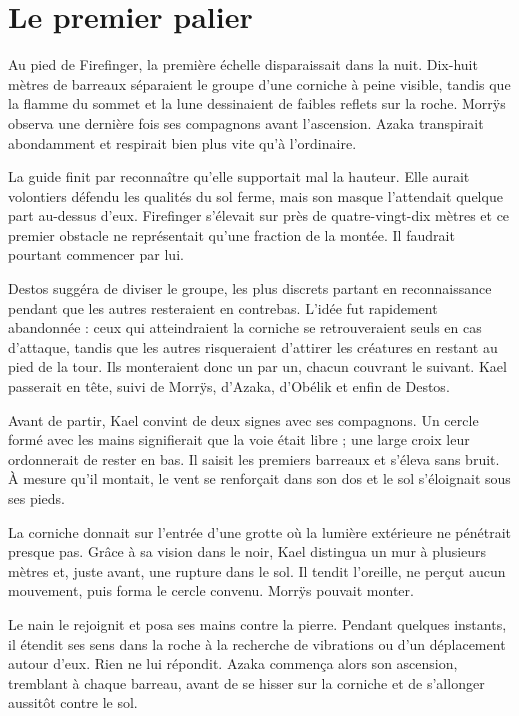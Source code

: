 \chapter{Le premier palier}

Au pied de Firefinger, la première échelle disparaissait dans la nuit. Dix-huit mètres de barreaux séparaient le groupe d'une corniche à peine visible, tandis que la flamme du sommet et la lune dessinaient de faibles reflets sur la roche. Morrÿs observa une dernière fois ses compagnons avant l'ascension. Azaka transpirait abondamment et respirait bien plus vite qu'à l'ordinaire.

La guide finit par reconnaître qu'elle supportait mal la hauteur. Elle aurait volontiers défendu les qualités du sol ferme, mais son masque l'attendait quelque part au-dessus d'eux. Firefinger s'élevait sur près de quatre-vingt-dix mètres et ce premier obstacle ne représentait qu'une fraction de la montée. Il faudrait pourtant commencer par lui.

Destos suggéra de diviser le groupe, les plus discrets partant en reconnaissance pendant que les autres resteraient en contrebas. L'idée fut rapidement abandonnée : ceux qui atteindraient la corniche se retrouveraient seuls en cas d'attaque, tandis que les autres risqueraient d'attirer les créatures en restant au pied de la tour. Ils monteraient donc un par un, chacun couvrant le suivant. Kael passerait en tête, suivi de Morrÿs, d'Azaka, d'Obélik et enfin de Destos.

Avant de partir, Kael convint de deux signes avec ses compagnons. Un cercle formé avec les mains signifierait que la voie était libre ; une large croix leur ordonnerait de rester en bas. Il saisit les premiers barreaux et s'éleva sans bruit. À mesure qu'il montait, le vent se renforçait dans son dos et le sol s'éloignait sous ses pieds.

La corniche donnait sur l'entrée d'une grotte où la lumière extérieure ne pénétrait presque pas. Grâce à sa vision dans le noir, Kael distingua un mur à plusieurs mètres et, juste avant, une rupture dans le sol. Il tendit l'oreille, ne perçut aucun mouvement, puis forma le cercle convenu. Morrÿs pouvait monter.

Le nain le rejoignit et posa ses mains contre la pierre. Pendant quelques instants, il étendit ses sens dans la roche à la recherche de vibrations ou d'un déplacement autour d'eux. Rien ne lui répondit. Azaka commença alors son ascension, tremblant à chaque barreau, avant de se hisser sur la corniche et de s'allonger aussitôt contre le sol.

